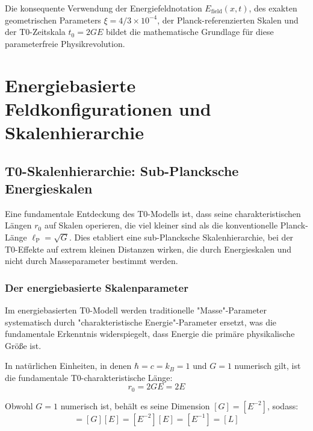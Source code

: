 \documentclass[12pt,a4paper]{report}
\newcommand{\lP}{\ell_{\text{P}}}         %
\newcommand{\rzero}{r_0}                  %
\begin{document}
	Die konsequente Verwendung der Energiefeldnotation $E_{\text{field}}(x,t)$, des exakten geometrischen Parameters $\xi = 4/3 \times 10^{-4}$, der Planck-referenzierten Skalen und der T0-Zeitskala $t_0 = 2GE$ bildet die mathematische Grundlage für diese parameterfreie Physikrevolution.
	
	\chapter{Energiebasierte Feldkonfigurationen und Skalenhierarchie}
	\label{chap:energy_field_configurations}
	
	\section{T0-Skalenhierarchie: Sub-Plancksche Energieskalen}
	\label{sec:scale_hierarchy}
	
	Eine fundamentale Entdeckung des T0-Modells ist, dass seine charakteristischen Längen $\rzero$ auf Skalen operieren, die viel kleiner sind als die konventionelle Planck-Länge $\lP = \sqrt{G}$. Dies etabliert eine sub-Plancksche Skalenhierarchie, bei der T0-Effekte auf extrem kleinen Distanzen wirken, die durch Energieskalen und nicht durch Masseparameter bestimmt werden.
	
	\subsection{Der energiebasierte Skalenparameter}
	\label{subsec:energy_scale_parameter}
	
	Im energiebasierten T0-Modell werden traditionelle "Masse"-Parameter systematisch durch "charakteristische Energie"-Parameter ersetzt, was die fundamentale Erkenntnis widerspiegelt, dass Energie die primäre physikalische Größe ist.
	
	In natürlichen Einheiten, in denen $\hbar = c = k_B = 1$ und $G = 1$ numerisch gilt, ist die fundamentale T0-charakteristische Länge:
	\begin{equation}
		\boxed{\rzero = 2GE = 2E}
		\label{eq:fundamental_r0}
	\end{equation}
	
	Obwohl $G = 1$ numerisch ist, behält es seine Dimension $[G] = [E^{-2}]$, sodass:
	\begin{equation}
		[\rzero] = [G][E] = [E^{-2}][E] = [E^{-1}] = [L]
		\label{eq:dimensional_consistency}
	\end{equation}
	
\end{document}
